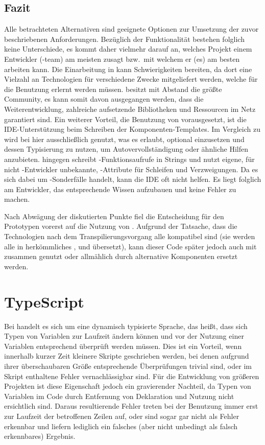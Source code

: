 \subsection{Fazit}
Alle betrachteten Alternativen sind geeignete Optionen zur Umsetzung der zuvor beschriebenen Anforderungen. Bezüglich der Funktionalität bestehen folglich keine Unterschiede, es kommt daher vielmehr darauf an, welches Projekt einem Entwickler (-team) am meisten zusagt bzw.\ mit welchem er (es) am besten arbeiten kann.
Die Einarbeitung in  kann Schwierigkeiten bereiten, da dort eine Vielzahl an Technologien für verschiedene Zwecke mitgeliefert werden, welche für die Benutzung erlernt werden müssen.  besitzt mit Abstand die größte Community, es kann somit davon ausgegangen werden, dass die Weiterentwicklung, zahlreiche aufsetzende Bibliotheken und Ressourcen im Netz garantiert sind. Ein weiterer Vorteil, die Benutzung von  vorausgesetzt, ist die IDE-Unterstützung beim Schreiben der Komponenten-Templates. Im Vergleich zu  wird bei  hier ausschließlich  genutzt, was es erlaubt, optional  einzusetzen und dessen Typisierung zu nutzen, um Autovervollständigung oder ähnliche Hilfen anzubieten.  hingegen schreibt -Funktionsaufrufe in Strings und nutzt eigene, für nicht -Entwickler unbekannte, -Attribute für Schleifen und Verzweigungen. Da es sich dabei um -Sonderfälle handelt, kann die IDE oft nicht helfen. Es liegt folglich am Entwickler, das entsprechende Wissen aufzubauen und keine Fehler zu machen.

Nach Abwägung der diskutierten Punkte fiel die Entscheidung für den Prototypen vorerst auf die Nutzung von . Aufgrund der Tatsache, dass die Technologien nach dem Transpilierungsvorgang alle kompatibel sind (sie werden alle in herkömmliches ,  und  übersetzt), kann dieser Code später jedoch auch mit  zusammen genutzt oder allmählich durch alternative Komponenten ersetzt werden.

\section{TypeScript}
Bei  handelt es sich um eine dynamisch typisierte Sprache, das heißt, dass sich Typen von Variablen zur Laufzeit ändern können und vor der Nutzung einer Variablen entsprechend überprüft werden müssen. Dies ist ein Vorteil, wenn innerhalb kurzer Zeit kleinere Skripte geschrieben werden, bei denen aufgrund ihrer überschaubaren Größe entsprechende Überprüfungen trivial sind, oder im Skript enthaltene Fehler vernachlässigbar sind. Für die Entwicklung von größeren Projekten ist diese Eigenschaft jedoch ein gravierender Nachteil, da Typen von Variablen im Code durch Entfernung von Deklaration und Nutzung nicht ersichtlich sind. Daraus resultierende Fehler treten bei der Benutzung immer erst zur Laufzeit der betroffenen Zeilen auf, oder sind sogar gar nicht als Fehler erkennbar und liefern lediglich ein falsches (aber nicht unbedingt als falsch erkennbares) Ergebnis.  

